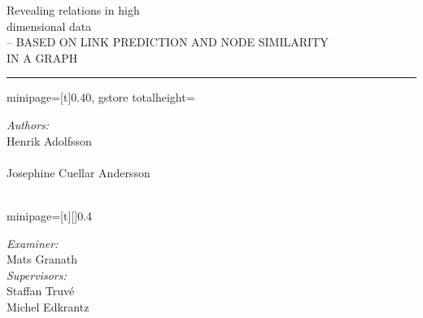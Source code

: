 
\begin{center}
	\bigskip
	\bigskip
	\Huge{Revealing relations in high \\dimensional data}\\
	\medskip
	\Large{-- BASED ON LINK PREDICTION AND NODE SIMILARITY \\IN A GRAPH} \\
\end{center}

\bigskip
\bigskip
\noindent\rule{\linewidth}{0.4pt}
\bigskip

\newlength\myheight
\begin{center}
	\begin{adjustbox}{%
		minipage=[t]{0.40\linewidth},
		gstore totalheight=\myheight
	}
		\begin{flushleft}
			\large \emph{Authors:}\\
			Henrik Adolfsson\\
			\\[0.3cm]
			Josephine Cuellar Andersson\\
			\\[0.3cm] 
		\end{flushleft}
	\end{adjustbox}
	\hspace{0.5cm}
	\begin{adjustbox}{minipage=[t][\myheight]{0.4\linewidth}}
		\begin{flushright} \large
			\emph{Examiner:} \\
			Mats Granath\\ [0.3cm]

			\emph{Supervisors:} \\
			Staffan Truv\'e\\
			Michel Edkrantz\\
		\end{flushright}
	\end{adjustbox}
\end{center}

\vspace*{\fill}

\begin{center}
	\Large{%
		\whereandwhen
	}
\end{center}


\thispagestyle{empty}
\newpage
